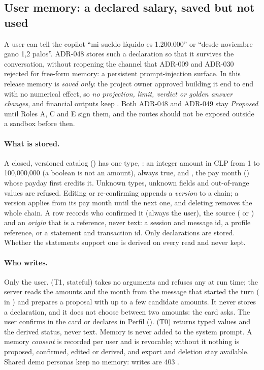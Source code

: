 \subsection{User memory: a declared salary, saved but not used}\label{sec:memory}

A user can tell the copilot ``mi sueldo líquido es 1.200.000'' or ``desde noviembre gano 1,2 palos''. ADR-048 stores
such a declaration so that it survives the conversation, without reopening the channel that ADR-009 and ADR-030
rejected for free-form memory: a persistent prompt-injection surface. In this release memory is \emph{saved only}: the
project owner approved building it end to end with no numerical effect, so \emph{no projection, limit, verdict or
golden answer changes}, and financial outputs keep . Both ADR-048 and ADR-049 stay \emph{Proposed} until
Roles A, C and E sign them, and the routes should not be exposed outside a sandbox before then.

\paragraph{What is stored.} A closed, versioned catalog  () has one type,
: an integer amount in CLP from 1 to 100{,}000{,}000 (a boolean is not an amount),  always
true, and , the pay month () whose payday first credits it. Unknown types, unknown
fields and out-of-range values are refused. Editing or re-confirming appends a \emph{version} to a chain; a version
applies from its pay month until the next one, and deleting removes the whole chain. A row records who confirmed it
(always the user), the source ( or ) and an \emph{origin} that is a reference, never text: a
session and message id, a profile reference, or a statement and transaction id. Only declarations are stored. Whether
the statements support one is derived on every read and never kept.

\paragraph{Who writes.} Only the user.  (T1, stateful) takes no arguments and refuses any
at run time; the server reads the amounts and the month from the message that started the turn
( in ) and prepares a proposal with up to a few candidate
amounts. It never stores a declaration, and it does not choose between two amounts: the card asks. The user confirms
in the card or declares in Perfil ().  (T0) returns typed values and
the derived status, never text. Memory is never added to the system prompt. A memory \emph{consent} is recorded per
user and is revocable; without it nothing is proposed, confirmed, edited or derived, and export and deletion stay
available. Shared demo personas keep no memory: writes are 403 .

